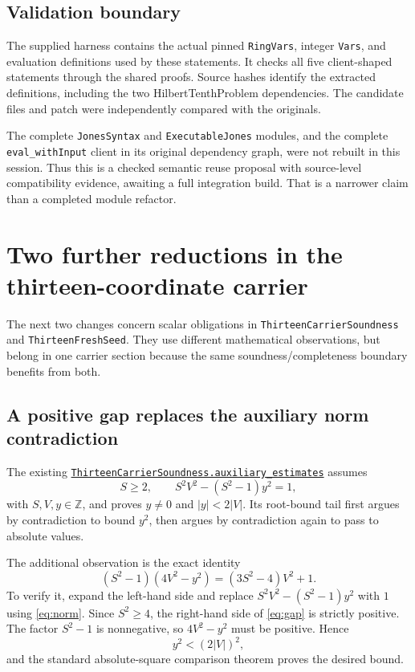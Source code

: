 \documentclass[11pt,letterpaper]{article}
\newcommand{\code}[1]{\nolinkurl{#1}}
\newcommand{\Z}{\mathbb Z}
\newcommand{\source}[2]{\href{https://github.com/VladimirReshetnikov/ProveIt/blob/efa64ca941cdae37bb6f7fc5093ae8bb69296ca3/Computability/DiophantineConsistency/Lean/DiophantineConsistency/#1.lean}{\code{#1.#2}}}
\begin{document}
\subsection{Validation boundary}

The supplied harness contains the actual pinned \code{RingVars}, integer \code{Vars}, and evaluation definitions used by these statements. It checks all five client-shaped statements through the shared proofs. Source hashes identify the extracted definitions, including the two HilbertTenthProblem dependencies. The candidate files and patch were independently compared with the originals.

The complete \code{JonesSyntax} and \code{ExecutableJones} modules, and the complete \code{eval_withInput} client in its original dependency graph, were not rebuilt in this session. Thus this is a checked semantic reuse proposal with source-level compatibility evidence, awaiting a full integration build. That is a narrower claim than a completed module refactor.

\section{Two further reductions in the thirteen-coordinate carrier}
\label{sec:carrier}

The next two changes concern scalar obligations in \code{ThirteenCarrierSoundness} and \code{ThirteenFreshSeed}. They use different mathematical observations, but belong in one carrier section because the same soundness/completeness boundary benefits from both.

\subsection{A positive gap replaces the auxiliary norm contradiction}
\label{sec:gap}

The existing \source{ThirteenCarrierSoundness}{auxiliary_estimates} assumes
\begin{equation}
 S\ge 2,\qquad S^2V^2-(S^2-1)y^2=1,
 \label{eq:norm}
\end{equation}
with $S,V,y\in\Z$, and proves $y\ne0$ and $|y|<2|V|$. Its root-bound tail first argues by contradiction to bound $y^2$, then argues by contradiction again to pass to absolute values.

The additional observation is the exact identity
\begin{equation}
 \boxed{\ (S^2-1)(4V^2-y^2)=(3S^2-4)V^2+1.\ }
 \label{eq:gap}
\end{equation}
To verify it, expand the left-hand side and replace
$S^2V^2-(S^2-1)y^2$ with $1$ using \eqref{eq:norm}. Since $S^2\ge4$, the right-hand side of \eqref{eq:gap} is strictly positive. The factor $S^2-1$ is nonnegative, so $4V^2-y^2$ must be positive. Hence
\[
 y^2<(2|V|)^2,
\]
and the standard absolute-square comparison theorem proves the desired bound.
\end{document}
